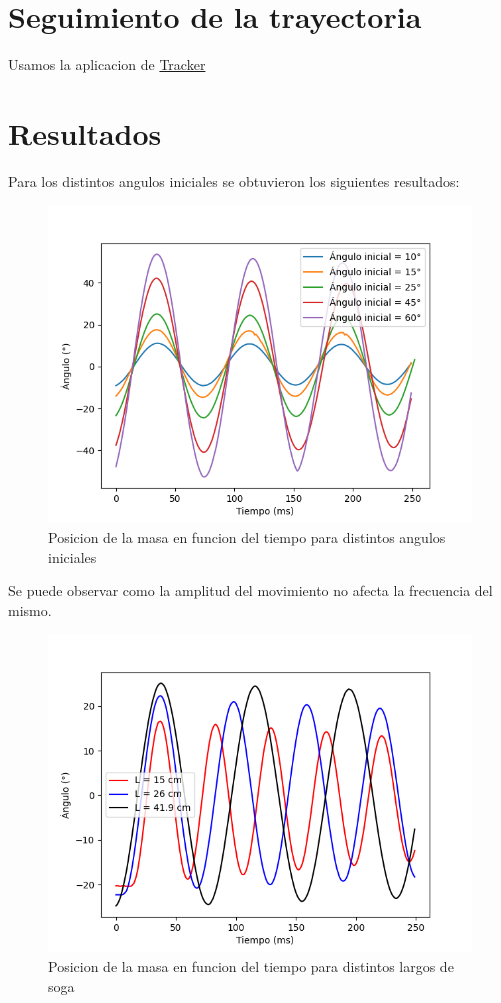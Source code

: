 \documentclass[12pt,a4]{article}
\begin{document}
\section{Seguimiento de la trayectoria}

Usamos la aplicacion de \href{https://physlets.org/tracker/}{Tracker}

\section{Resultados}

Para los distintos angulos iniciales se obtuvieron los siguientes resultados:

\begin{figure}[H]
    \centering
    \includegraphics[width=0.6\linewidth]{angulos.png}
    \caption{Posicion de la masa en funcion del tiempo para distintos angulos iniciales}
    \label{fig:angulos}
\end{figure}

Se puede observar como la amplitud del movimiento no afecta la frecuencia del mismo. 

\begin{figure}[H]
    \centering
    \includegraphics[width=0.6\linewidth]{largo.png}
    \caption{Posicion de la masa en funcion del tiempo para distintos largos de soga}
    \label{fig:largo}
\end{figure}
\end{document}
